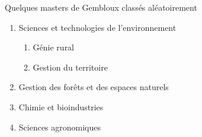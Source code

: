 Quelques masters de Gembloux classés aléatoirement
\begin{enumerate}[label=\arabic*]
\item Sciences et technologies de l'environnement
\begin{enumerate}[label=\alph* --,leftmargin=1.5cm]		
\item Génie rural
\item Gestion du territoire
\end{enumerate}
\item Gestion des forêts et des espaces naturels
\item Chimie et bioindustries	
\item Sciences agronomiques
\end{enumerate}
